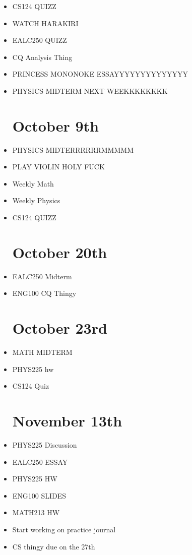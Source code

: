 \documentclass{report}
\newcommand{\done}{\textbf{\checkmark}}
\begin{document}
\begin{itemize}
\item
CS124 QUIZZ \done

\item
WATCH HARAKIRI \done

\item
EALC250 QUIZZ \done

\item
CQ Analysis Thing \done

\item
PRINCESS MONONOKE ESSAYYYYYYYYYYYYYY \done

\item
PHYSICS MIDTERM NEXT WEEKKKKKKKK


\chapter{October 9th}
\item
PHYSICS MIDTERRRRRRMMMMM \done

\item
PLAY VIOLIN HOLY FUCK \done

\item
Weekly Math \done

\item
Weekly Physics \done

\item
CS124 QUIZZ \done

\chapter{October 20th}
\item
EALC250 Midterm \done

\item
ENG100 CQ Thingy \done


\chapter{October 23rd}
\item
MATH MIDTERM

\item
PHYS225 hw

\item
CS124 Quiz


\chapter{November 13th}
\item
PHYS225 Discussion \done
\item
EALC250 ESSAY
\item
PHYS225 HW \done
\item
ENG100 SLIDES \done
\item
MATH213 HW \done
\item
Start working on practice journal
\item
CS thingy due on the 27th \done




\end{itemize}
\end{document}
